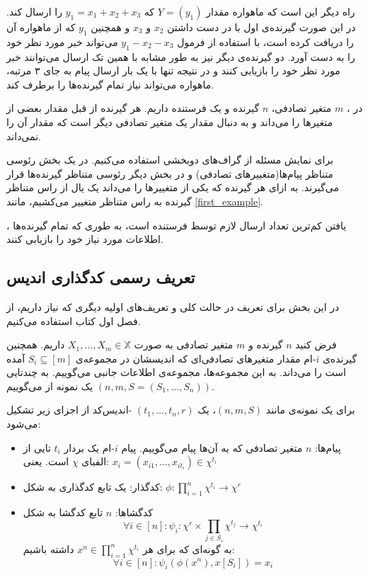 راه دیگر این است که ماهواره مقدار
$Y = (y_1)$
که
$y_1 = x_1 + x_2 + x_3$
را ارسال کند. در این صورت گیرنده‌ی اول با در دست داشتن
$x_2$
و
$x_3$
و همچنین
$y_1$
که از ماهواره آن را دریافت کرده است، با استفاده از فرمول
$y_1 - x_2 - x_3$
می‌تواند خبر مورد نظر خود را به دست آورد. دو گیرنده‌ی دیگر نیز به طور مشابه با همین تک ارسال می‌توانند خبر مورد نظر خود را بازیابی کنند و در نتیجه تنها با یک بار ارسال پیام به جای ۳ مرتبه، ماهواره می‌تواند نیاز تمام گیرنده‌ها را برطرف کند.

در 
\icod،
$m$
متغیر تصادفی،
$n$
گیرنده و یک فرستنده داریم. هر گیرنده از قبل مقدار بعضی از متغیرها را می‌داند و به دنبال مقدار یک متغیر تصادفی دیگر است که مقدار آن را نمی‌داند.

برای نمایش مسئله از گراف‌های دوبخشی استفاده می‌کنیم. در یک بخش رئوسی متناظر پیام‌ها(متغییرهای تصادفی) و در بخش دیگر رئوسی متناظر گیرنده‌ها قرار می‌گیرند. به ازای هر گیرنده که یکی از متغییرها را می‌داند یک یال از راس متناظر گیرنده به راس متناظر متغییر می‌کشیم، مانند
\autoref{first_example}.

\icod، یافتن کم‌ترین تعداد ارسال لازم توسط فرستنده است، به طوری که تمام گیرنده‌ها اطلاعات مورد نیاز خود را بازیابی کنند.
	\subsection{تعریف رسمی کدگذاری اندیس}
در این بخش برای تعریف 
\icod
در حالت کلی و تعریف‌های اولیه دیگری که نیاز داریم، از فصل اول کتاب
\cite{fatemehbook}
استفاده می‌کنیم.
\begin{definition}[\icod]
	فرض کنید
	$n$
	گیرنده و
	$m$
	متغیر تصادفی به صورت
	$X_1, \ldots, X_m \in \mathbb{X}$
	داریم. همچنین گیرنده‌ی
	$i$-ام
	مقدار متغیرهای تصادفی‌ای که اندیسشان در مجموعه‌ی
	$S_i \subseteq [m]$
	آمده است را می‌داند.	به این مجموعه‌ها، مجموعه‌ی اطلاعات جانبی می‌گوییم. به چندتایی
	$(n, m, S =(S_1, \ldots, S_n) )$
	یک نمونه از
	\icod
	می‌گوییم.
\end{definition}
\begin{definition}[اندیس‌کد]
	\label{def:icod}
	برای یک نمونه‌ی \icod مانند
	$(n, m, S)$،
	یک
	$(t_1, \ldots, t_n, r)$
	-اندیس‌کد از اجزای زیر تشکیل می‌شود:
	\begin{itemize}
		\item 
      پیام‌ها:
		$n$
		 متغیر تصادفی که به آن‌ها پیام می‌گوییم. پیام
		  $i$-ام
            یک بردار 
		  $t_i$ تایی
            از الفبای
		  $\chi$
		  است. یعنی:
		  $x_i = (x_{i1}, \ldots, x_{it_i}) \in \chi^{t_i}$
		  \item
		  کدگذار:
		   یک تابع کدگذاری به شکل:
		   $\phi: \prod\limits_{i = 1}^n \chi^{t_i}  \rightarrow \chi^r$
		  \item
		  کدگشاها:
		  $n$
		  تابع کدگشا به شکل
		  $$\forall i \in [n]: \psi_i: \chi^r \times  \prod\limits_{j \in S_i} \chi^{t_j} \rightarrow \chi^{t_i}$$
		  به گونه‌ای که برای هر
		  $x^n \in \prod\limits_{i = 1}^{n} \chi^{t_i}$
		  داشته باشیم:
		  $$\forall i \in [n]: \psi_i(\phi(x^n), x[S_i]) = x_i$$
	\end{itemize}
\end{definition}

